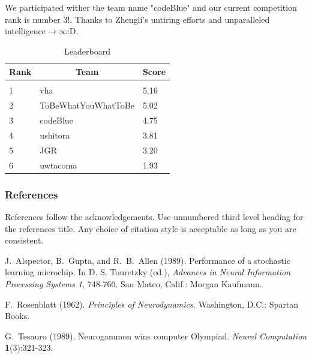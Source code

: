 \documentclass[letterpaper]{article}
\begin{document}
We participated wither the team name "codeBlue" and our current competition rank is number 3!. Thanks to Zhengli's untiring efforts and unparalleled intelligence$\longrightarrow\infty$:D. 

\begin{table}[h]
	\caption{Leaderboard}
	\label{sample-table}
	\begin{center}
		\begin{tabular}{lll}
			\multicolumn{1}{c}{\bf Rank} & \multicolumn{1}{c}{\bf Team} & \multicolumn{1}{c}{\bf Score} \\
			\hline \\
			1                            & vha                          & 5.16                          \\
			2                            & ToBeWhatYouWhatToBe          & 5.02                          \\
			3                            & codeBlue                     & 4.75                          \\
			4                            & ushitora                     & 3.81                          \\
			5                            & JGR                          & 3.20                          \\
			6                            & uwtacoma                     & 1.93                          \\
		\end{tabular}
	\end{center}
\end{table}

\newpage


\subsubsection*{References}

References follow the acknowledgements.  Use unnumbered third level
heading for the references title.  Any choice of citation style is
acceptable as long as you are consistent.


J.~Alspector, B.~Gupta, and R.~B.~Allen  (1989). Performance of a
stochastic learning microchip.  In D. S. Touretzky (ed.), {\it Advances
in Neural Information Processing Systems 1}, 748-760.  San Mateo, Calif.:
Morgan Kaufmann.

F.~Rosenblatt (1962). {\it Principles of Neurodynamics.} Washington,
D.C.: Spartan Books.

G.~Tesauro (1989). Neurogammon wins computer Olympiad.  {\it Neural
	Computation} {\bf 1}(3):321-323.
\end{document}
